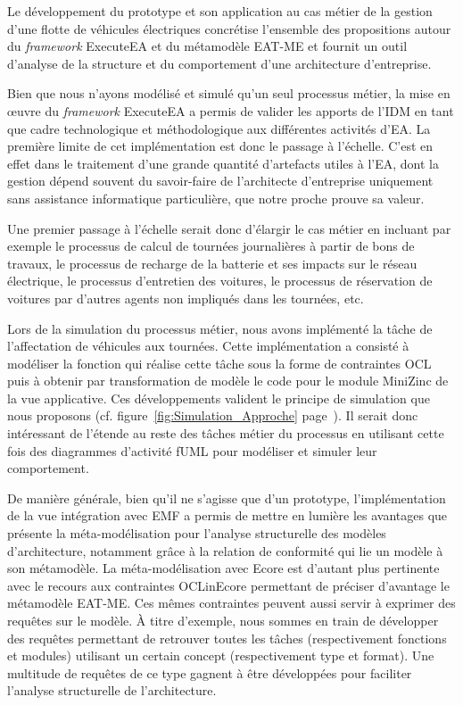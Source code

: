     Le développement du prototype et son application au cas métier
    de la gestion d'une flotte de véhicules électriques concrétise l'ensemble des
    propositions autour du \emph{framework} ExecuteEA et du métamodèle EAT-ME
    et fournit un outil d'analyse de la structure et du comportement
    d'une architecture d'entreprise.

    Bien que nous n'ayons modélisé et simulé qu'un seul processus métier, la mise
    en œuvre du \emph{framework} ExecuteEA a permis de valider les apports de l'IDM
    en tant que cadre technologique et méthodologique aux différentes activités d'EA.
    La première limite de cet implémentation est donc le passage à l'échelle. C'est en effet dans le
    traitement d'une grande quantité d'artefacts utiles à l'EA, dont la gestion dépend souvent du 
    savoir-faire de l'architecte d'entreprise uniquement
    sans assistance informatique particulière, que notre  proche prouve sa valeur.

    Une premier passage à l'échelle serait donc d'élargir le cas métier en incluant par exemple
    le processus de calcul de tournées journalières à partir de bons de travaux, le processus
    de recharge de la batterie et ses impacts sur le réseau électrique, le processus d'entretien des
    voitures, le processus de réservation de voitures par d'autres agents non impliqués dans les tournées,
    etc. 

    Lors de la simulation du processus métier, nous avons implémenté la
    tâche de l'affectation de véhicules aux tournées. Cette implémentation a consisté à modéliser
    la fonction qui réalise cette tâche sous la forme de contraintes OCL puis à obtenir par transformation
    de modèle le code pour le module MiniZinc de la vue applicative. 
    Ces développements valident le principe
    de simulation que nous proposons (cf. figure~\ref{fig:Simulation_Approche} page~\pageref{fig:Simulation_Approche}).
    Il serait donc intéressant de l'étende au reste des tâches métier du processus en utilisant cette fois des diagrammes
    d'activité fUML pour modéliser et simuler leur comportement.

    De manière générale, bien qu'il ne s'agisse que d'un prototype, l'implémentation de la vue intégration avec EMF
    a permis de mettre en lumière les avantages que présente la méta-modélisation pour l'analyse structurelle
    des modèles d'architecture, notamment grâce à la relation de conformité qui lie un modèle à son métamodèle.
    La méta-modélisation avec Ecore est d'autant plus pertinente avec le recours aux contraintes OCLinEcore
    permettant de préciser d'avantage le métamodèle EAT-ME. Ces mêmes contraintes peuvent aussi servir à
    exprimer des requêtes sur le modèle. À titre d'exemple, nous sommes en train de développer des requêtes
    permettant de retrouver toutes les tâches (respectivement
    fonctions et modules) utilisant un certain concept (respectivement type et format). Une multitude de requêtes de ce
    type gagnent à être développées pour faciliter l'analyse structurelle de l'architecture.


